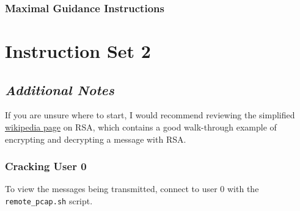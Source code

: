         \newpage







        \subsubsection{Maximal Guidance Instructions}







            {\parindent0pt\singlespacing







                \section*{Instruction Set 2}







                    \subsection*{\textit{Additional Notes}}







                        If you are unsure where to start, I would recommend reviewing the simplified \href{https://simple.wikipedia.org/wiki/RSA_algorithm}{wikipedia page} on RSA, which contains a good walk-through example of encrypting and decrypting a message with RSA.















                        \subsubsection*{Cracking User 0}







                            To view the messages being transmitted, connect to user 0 with the \lstinline`remote_pcap.sh` script. 







}
